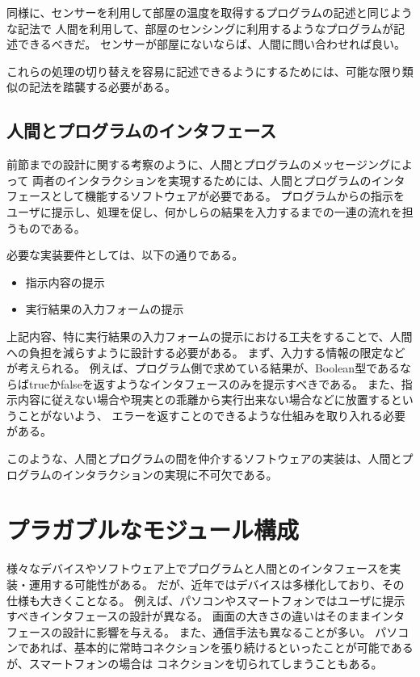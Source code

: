 同様に、センサーを利用して部屋の温度を取得するプログラムの記述と同じような記法で
人間を利用して、部屋のセンシングに利用するようなプログラムが記述できるべきだ。
センサーが部屋にないならば、人間に問い合わせれば良い。

これらの処理の切り替えを容易に記述できるようにするためには、可能な限り類似の記法を踏襲する必要がある。

\subsection{人間とプログラムのインタフェース}\label{ux4ebaux9593ux3068ux30d7ux30edux30b0ux30e9ux30e0ux306eux30a4ux30f3ux30bfux30d5ux30a7ux30fcux30b9}

前節までの設計に関する考察のように、人間とプログラムのメッセージングによって
両者のインタラクションを実現するためには、人間とプログラムのインタフェースとして機能するソフトウェアが必要である。
プログラムからの指示をユーザに提示し、処理を促し、何かしらの結果を入力するまでの一連の流れを担うものである。

必要な実装要件としては、以下の通りである。

\begin{itemize}
\itemsep1pt\parskip0pt
\item
  指示内容の提示
\item
  実行結果の入力フォームの提示
\end{itemize}

上記内容、特に実行結果の入力フォームの提示における工夫をすることで、人間への負担を減らすように設計する必要がある。
まず、入力する情報の限定などが考えられる。
例えば、プログラム側で求めている結果が、Boolean型であるならばtrueかfalseを返すようなインタフェースのみを提示すべきである。
また、指示内容に従えない場合や現実との乖離から実行出来ない場合などに放置するということがないよう、
エラーを返すことのできるような仕組みを取り入れる必要がある。

このような、人間とプログラムの間を仲介するソフトウェアの実装は、人間とプログラムのインタラクションの実現に不可欠である。

\section{プラガブルなモジュール構成}\label{sec:plaggable-module-design}

様々なデバイスやソフトウェア上でプログラムと人間とのインタフェースを実装・運用する可能性がある。
だが、近年ではデバイスは多様化しており、その仕様も大きくことなる。
例えば、パソコンやスマートフォンではユーザに提示すべきインタフェースの設計が異なる。
画面の大きさの違いはそのままインタフェースの設計に影響を与える。
また、通信手法も異なることが多い。
パソコンであれば、基本的に常時コネクションを張り続けるといったことが可能であるが、スマートフォンの場合は
コネクションを切られてしまうこともある。

